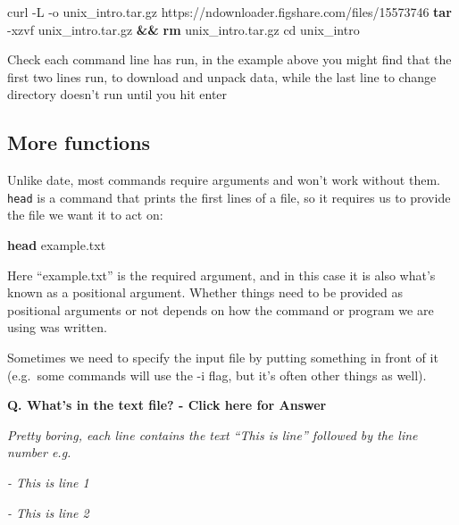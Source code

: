 \documentclass[
]{book}
\makeatletter
\newenvironment{Shaded}{\begin{snugshade}}{\end{snugshade}}
\newcommand{\AttributeTok}[1]{\textcolor[rgb]{0.13,0.29,0.53}{#1}}
\newcommand{\BuiltInTok}[1]{#1}
\newcommand{\ExtensionTok}[1]{#1}
\newcommand{\FunctionTok}[1]{\textcolor[rgb]{0.13,0.29,0.53}{\textbf{#1}}}
\newcommand{\KeywordTok}[1]{\textcolor[rgb]{0.13,0.29,0.53}{\textbf{#1}}}
\newcommand{\NormalTok}[1]{#1}
\newenvironment{kframe}{%
\medskip{}
\setlength{\fboxsep}{.8em}
 \def\at@end@of@kframe{}%
 \ifinner\ifhmode%
  \def\at@end@of@kframe{\end{minipage}}%
  \begin{minipage}{\columnwidth}%
 \fi\fi%
 \def\FrameCommand##1{\hskip\@totalleftmargin \hskip-\fboxsep
 \colorbox{shadecolor}{##1}\hskip-\fboxsep
     \hskip-\linewidth \hskip-\@totalleftmargin \hskip\columnwidth}%
 \MakeFramed {\advance\hsize-\width
   \@totalleftmargin\z@ \linewidth\hsize
   \@setminipage}}%
 {\par\unskip\endMakeFramed%
 \at@end@of@kframe}
\newenvironment{block}[1]
  {
  \begin{itemize}
  \renewcommand{\labelitemi}{
    \raisebox{-.7\height}[0pt][0pt]{
      {\setkeys{Gin}{width=3em,keepaspectratio}\texttt{[image: images/\#1]}}
    }
  }
  \setlength{\fboxsep}{1em}
  \begin{kframe}
  \item
  }
  {
  \end{kframe}
  \end{itemize}
  }
\newenvironment{rmdwarning}
  {\begin{block}{warning}}
  {\end{block}}
\makeatother
\begin{document}
\begin{Shaded}
\begin{Highlighting}[]
    \ExtensionTok{curl} \AttributeTok{{-}L} \AttributeTok{{-}o}\NormalTok{ unix\_intro.tar.gz https://ndownloader.figshare.com/files/15573746}
    \FunctionTok{tar} \AttributeTok{{-}xzvf}\NormalTok{ unix\_intro.tar.gz }\KeywordTok{\&\&} \FunctionTok{rm}\NormalTok{ unix\_intro.tar.gz}
    \BuiltInTok{cd}\NormalTok{ unix\_intro}
\end{Highlighting}
\end{Shaded}

\begin{rmdwarning}
Check each command line has run, in the example above you might find
that the first two lines run, to download and unpack data, while the
last line to change directory doesn't run until you hit enter
\end{rmdwarning}

\hypertarget{more-functions}{%
\subsection{More functions}\label{more-functions}}

Unlike date, most commands require arguments and won't work without them. \texttt{head} is a command that prints the first lines of a file, so it requires us to provide the file we want it to act on:

\begin{Shaded}
\begin{Highlighting}[]
    \FunctionTok{head}\NormalTok{ example.txt}
\end{Highlighting}
\end{Shaded}

Here ``example.txt'' is the required argument, and in this case it is also what's known as a positional argument. Whether things need to be provided as positional arguments or not depends on how the command or program we are using was written.

Sometimes we need to specify the input file by putting something in front of it (e.g.~some commands will use the -i flag, but it's often other things as well).

\textbf{Q. What's in the text file? - Click here for Answer}

\emph{Pretty boring, each line contains the text ``This is line'' followed by the line number e.g.}

\emph{- This is line 1}

\emph{- This is line 2}
\end{document}
